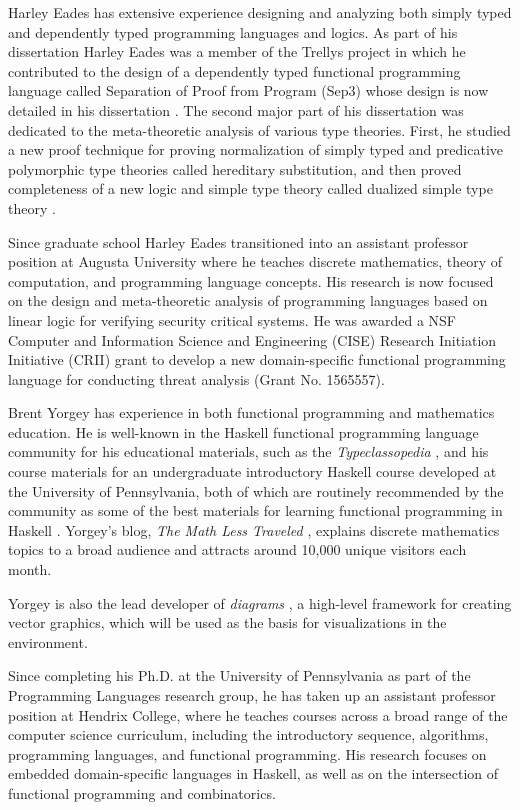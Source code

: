 Harley Eades has extensive experience designing and analyzing both
simply typed and dependently typed programming languages and
logics. As part of his dissertation Harley Eades was a member of the
Trellys project \cite{Kimmel:2013,Sjoberg:2012} in which he
contributed to the design of a dependently typed functional
programming language called Separation of Proof from Program (Sep3)
whose design is now detailed in his dissertation
\cite{Eades:2014b,Kimmel:2013}. The second major part of his
dissertation was dedicated to the meta-theoretic analysis of various
type theories. First, he studied a new proof technique for proving
normalization of simply typed and predicative polymorphic type
theories called hereditary substitution, and then proved completeness
of a new logic and simple type theory called dualized simple type
theory \cite{Eades:2014b}.

Since graduate school Harley Eades transitioned into an assistant
professor position at Augusta University where he teaches discrete
mathematics, theory of computation, and programming language
concepts. His research is now focused on the design and meta-theoretic
analysis of programming languages based on linear logic for verifying
security critical systems.  He was awarded a NSF Computer and
Information Science and Engineering (CISE) Research Initiation
Initiative (CRII) grant to develop a new domain-specific functional
programming language for conducting threat analysis (Grant
No. 1565557).

Brent Yorgey has experience in both functional programming and
mathematics education.  He is well-known in the Haskell functional
programming language community for his educational materials, such as
the \emph{Typeclassopedia} \cite{Typeclassopedia}, and his course
materials for an undergraduate introductory Haskell course developed
at the University of Pennsylvania, both of which are routinely
recommended by the community as some of the best materials for
learning functional programming in Haskell \cite{bitemyapp-learn}.
Yorgey's blog, \emph{The Math Less Traveled} \cite{yorgey-tmlt},
explains discrete mathematics topics to a broad audience and attracts
around 10,000 unique visitors each month.

Yorgey is also the lead developer of \emph{diagrams} \cite{diagrams}, a
high-level framework for creating vector graphics, which will be used
as the basis for visualizations in the \thelang environment.

Since completing his Ph.D. at the University of Pennsylvania as part
of the Programming Languages research group, he has taken up an
assistant professor position at Hendrix College, where he teaches
courses across a broad range of the computer science curriculum,
including the introductory sequence, algorithms, programming
languages, and functional programming.  His research focuses on
embedded domain-specific languages in Haskell, as well as on the
intersection of functional programming and combinatorics.
